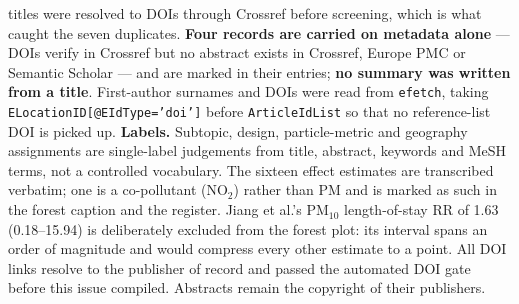 \documentclass[10pt]{article}
\begin{document}
\begin{keybox}
{titles were resolved to DOIs through Crossref before screening, which is what caught the
seven duplicates. \textbf{Four records are carried on metadata alone} --- DOIs verify in
Crossref but no abstract exists in Crossref, Europe PMC or Semantic Scholar --- and are
marked in their entries; \textbf{no summary was written from a title}. First-author
surnames and DOIs were read from \texttt{efetch}, taking
\texttt{ELocationID[@EIdType='doi']} before \texttt{ArticleIdList} so that no reference-list
DOI is picked up.
\textbf{Labels.} Subtopic, design, particle-metric and geography assignments are
single-label judgements from title, abstract, keywords and MeSH terms, not a controlled
vocabulary. The sixteen effect estimates are transcribed verbatim; one is a co-pollutant
(NO$_2$) rather than PM and is marked as such in the forest caption and the register.
Jiang et al.'s PM$_{10}$ length-of-stay RR of 1.63 (0.18--15.94) is deliberately excluded
from the forest plot: its interval spans an order of magnitude and would compress every
other estimate to a point.
All DOI links resolve to the publisher of record and passed the automated DOI gate before
this issue compiled. Abstracts remain the copyright of their publishers.\par}
\end{keybox}
\end{document}
